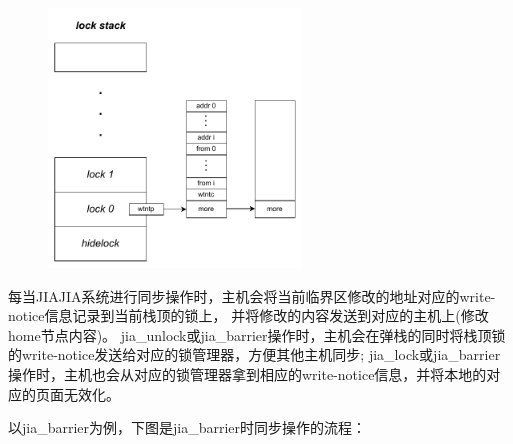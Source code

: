 {    \begin{figure}[!htbp]
        \centering
        \includegraphics[width=0.6\textwidth]{Img/JIAJIA锁栈结构.drawio.pdf}
        \label{fig:JIAJIA-lockstack}
    \end{figure}

    每当JIAJIA系统进行同步操作时，主机会将当前临界区修改的地址对应的write-notice信息记录到当前栈顶的锁上，
    并将修改的内容发送到对应的主机上(修改home节点内容)。
    jia\_unlock或jia\_barrier操作时，主机会在弹栈的同时将栈顶锁的write-notice发送给对应的锁管理器，方便其他主机同步;
    jia\_lock或jia\_barrier操作时，主机也会从对应的锁管理器拿到相应的write-notice信息，并将本地的对应的页面无效化。

    以jia\_barrier为例，下图是jia\_barrier时同步操作的流程：



}
